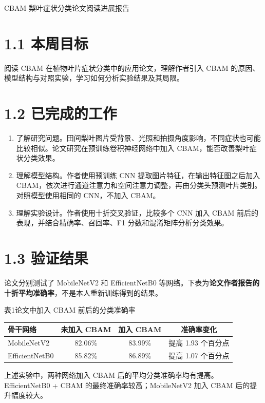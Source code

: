 \documentclass[UTF8,11pt,fontset=windows]{ctexart}
\begin{document}
\begin{center}{\heiti{} CBAM 梨叶症状分类论文阅读进展报告}\end{center}

\section{1.1 本周目标}
阅读 CBAM 在植物叶片症状分类中的应用论文，理解作者引入 CBAM 的原因、模型结构与对照实验，学习如何分析实验结果及其局限。

\section{1.2 已完成的工作}
\begin{enumerate}
\item 了解研究问题。田间梨叶图片受背景、光照和拍摄角度影响，不同症状也可能比较相似。论文研究在预训练卷积神经网络中加入 CBAM，能否改善梨叶症状分类效果。
\item 理解模型结构。作者使用预训练 CNN 提取图片特征，在输出特征图之后加入 CBAM，依次进行通道注意力和空间注意力调整，再由分类头预测叶片类别。对照模型使用相同的 CNN，不加入 CBAM。
\item 理解实验设计。作者使用十折交叉验证，比较多个 CNN 加入 CBAM 前后的表现，并结合精确率、召回率、F1 分数和混淆矩阵分析分类效果。
\end{enumerate}

\section{1.3 验证结果}
论文分别测试了 MobileNetV2 和 EfficientNetB0 等网络。下表为\textbf{论文作者报告的十折平均准确率}，不是本人重新训练得到的结果。
\begin{center}
{\small 表1\quad 论文中加入 CBAM 前后的分类准确率}\par\vspace{3pt}
\small
\begin{tabular}{lccc}
\toprule
骨干网络 & 未加入 CBAM & 加入 CBAM & 准确率变化 \\
\midrule
MobileNetV2    & 82.06\% & 83.99\% & 提高 1.93 个百分点 \\
EfficientNetB0 & 85.82\% & 86.89\% & 提高 1.07 个百分点 \\
\bottomrule
\end{tabular}
\end{center}
上述实验中，两种网络加入 CBAM 后的平均分类准确率均有提高。EfficientNetB0 + CBAM 的最终准确率较高；MobileNetV2 加入 CBAM 后的提升幅度较大。
\end{document}
